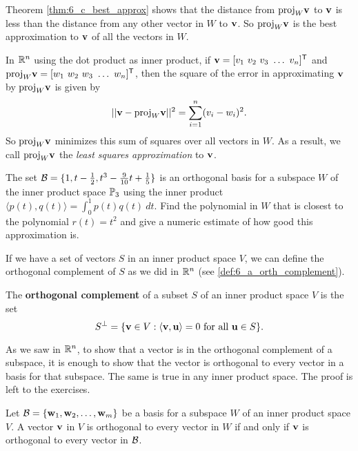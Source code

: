 Theorem \ref{thm:6_c_best_approx} shows that the distance from $\text{proj}_W \mathbf{v}$ to $\mathbf{v}$ is less than the distance from any other vector in $W$ to $\mathbf{v}$. So $\text{proj}_W \mathbf{v}$ is the best approximation to $\mathbf{v}$ of all the vectors in $W$.

In $\mathbb{R}^n$ using the dot product as inner product, if $\vv = [v_1 \ v_2 \ v_3 \ \ldots \ v_n]^{\tr}$ and $\text{proj}_W \mathbf{v} =  [w_1 \ w_2 \ w_3 \ \ldots \ w_n]^{\mathsf{T}}$, then the square of the error in approximating $\mathbf{v}$ by $\text{proj}_W \mathbf{v}$ is given by
\[|| \mathbf{v} - \text{proj}_W \mathbf{v} ||^2 = \sum_{i=1}^n (v_i - w_i)^2.\]
So $\text{proj}_W \mathbf{v}$ minimizes this sum of squares over all vectors in $W$. As a result, we call $\text{proj}_W \mathbf{v}$ the \emph{least squares approximation} to $\mathbf{v}$.


\begin{activity} The set $\mathcal{B} = \{1, t-\frac{1}{2}, t^3-\frac{9}{10}t+\frac{1}{5}\}$ is an orthogonal basis for a subspace $W$ of the inner product space $\mathbb{P}_3$ using the inner product $\langle p(t), q(t) \rangle = \int_0^1 p(t)q(t) \ dt$. Find the polynomial in $W$ that is closest to the polynomial $r(t) = t^2$ and give a numeric estimate of how good this approximation is.


\end{activity}


\label{sec:orthog_comp}

If we have a set of vectors $S$ in an inner product space $V$, we can define the orthogonal complement of $S$ as we did in $\mathbb{R}^n$ (see \ref{def:6_a_orth_complement}).

\begin{definition} The \textbf{orthogonal complement} of a subset $S$ of an inner product space $V$ is the set
\[S^{\perp} = \{\mathbf{v} \in V : \langle \mathbf{v}, \mathbf{u} \rangle = 0 \text{ for all } \mathbf{u} \in S\}.\]
\end{definition}

As we saw in $\mathbb{R}^n$, to show that a vector is in the orthogonal complement of a subspace, it is enough to show that the vector is orthogonal to every vector in a basis for that subspace. The same is true in any inner product space. The proof is left to the exercises. 

\begin{theorem} \label{thm:6_e_ip_orth_complement_basis} Let $\mathcal{B} = \{\mathbf{w}_1, \mathbf{w}_2, \ldots, \mathbf{w}_m\}$ be a basis for a subspace $W$ of an inner product space $V$. A vector $\mathbf{v}$ in $V$ is orthogonal to every vector in $W$ if and only if $\mathbf{v}$ is orthogonal to every vector in $\mathcal{B}$.
\end{theorem}


